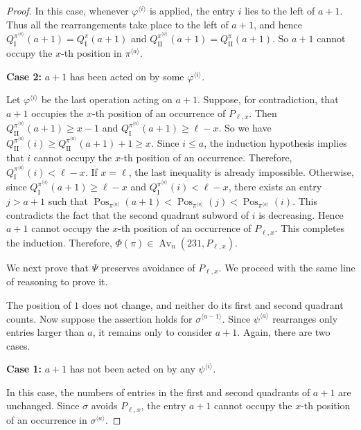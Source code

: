 \documentclass[10pt,a4paper]{amsart}
\begin{document}
\begin{proof}
In this case, whenever $\varphi^{\langle i\rangle}$ is applied, the entry
$i$ lies to the left of $a+1$. 
Thus all the rearrangements take place
to the left of $a+1$, and hence
$Q_{\mathrm I}^{\pi^{\langle a\rangle}}(a+1)
=
Q_{\mathrm I}^{\pi}(a+1)$
and
$Q_{\mathrm{II}}^{\pi^{\langle a\rangle}}(a+1)
=
Q_{\mathrm{II}}^{\pi}(a+1)$.
So $a+1$ cannot occupy the $x$-th position in $\pi^{\langle a\rangle}$.

\noindent \textbf{Case 2:} $a+1$ has been acted on by some
$\varphi^{\langle i\rangle}$.

Let $\varphi^{\langle i\rangle}$ be the last operation acting on $a+1$.
Suppose, for contradiction, that $a+1$ occupies the $x$-th position
of an occurrence of $P_{\ell,x}$. Then
$Q_{\mathrm{II}}^{\pi^{\langle a\rangle}}(a+1)\geq x-1$ and
$Q_{\mathrm I}^{\pi^{\langle a\rangle}}(a+1)\geq\ell-x$.
So we have 
$
Q_{\mathrm{II}}^{\pi^{\langle a\rangle}}(i)
\geq
Q_{\mathrm{II}}^{\pi^{\langle a\rangle}}(a+1)+1
\geq x$.
Since $i\leq a$, the induction hypothesis implies that $i$ cannot
occupy the $x$-th position of an occurrence. Therefore,
$Q_{\mathrm I}^{\pi^{\langle a\rangle}}(i)<\ell-x$.
If $x=\ell$, the last inequality is already impossible. Otherwise,
since
$Q_{\mathrm I}^{\pi^{\langle a\rangle}}(a+1)\geq\ell-x$ and
$Q_{\mathrm I}^{\pi^{\langle a\rangle}}(i)<\ell-x$,
there exists an entry $j>a+1$ such that
$\operatorname{Pos}_{\pi^{\langle a\rangle}}(a+1)
<
\operatorname{Pos}_{\pi^{\langle a\rangle}}(j)
<
\operatorname{Pos}_{\pi^{\langle a\rangle}}(i)$.
This contradicts the fact that the
second quadrant subword of $i$ is decreasing. 
Hence $a+1$ cannot
occupy the $x$-th position of an occurrence of $P_{\ell,x}$.
This completes the induction. Therefore, $\Phi(\pi)\in\operatorname{Av}_n(231,P_{\ell,x})$.

We next prove that $\Psi$ preserves avoidance of $P_{\ell,x}$. 
We proceed with the same line of reasoning to prove it.

The position of $1$ does not change, and neither do its
first and second quadrant counts. 
Now suppose the assertion holds
for $\sigma^{\langle a-1\rangle}$. Since
$\psi^{\langle a\rangle}$ rearranges only entries larger than $a$,
it remains only to consider $a+1$.
Again, there are two cases.

\noindent \textbf{Case 1:} $a+1$ has not been acted on by any
$\psi^{\langle i\rangle}$.

In this case, the numbers of entries in the first and second quadrants
of $a+1$ are unchanged. Since $\sigma$ avoids $P_{\ell,x}$, the entry
$a+1$ cannot occupy the $x$-th position of an occurrence in
$\sigma^{\langle a\rangle}$.


\end{proof}
\end{document}
